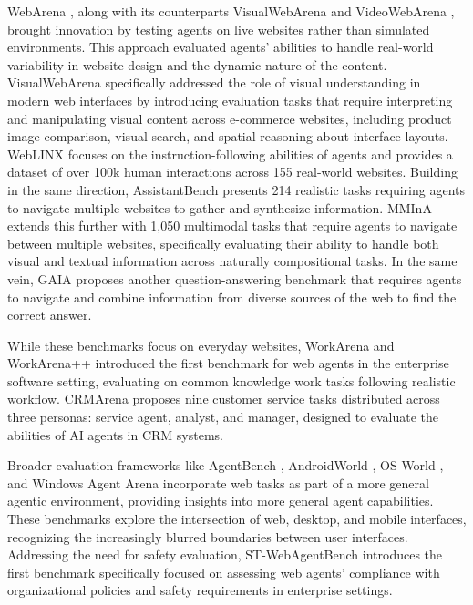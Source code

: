 \documentclass[10pt]{article} %
\begin{document}
WebArena \citep{webarena}, along with its counterparts VisualWebArena \citep{visual-webarena} and VideoWebArena \citep{jang2024videowebarenaevaluatinglongcontext}, brought innovation by testing agents on live websites rather than simulated environments. This approach evaluated agents' abilities to handle real-world variability in website design and the dynamic nature of the content. VisualWebArena specifically addressed the role of visual understanding in modern web interfaces by introducing evaluation tasks that require interpreting and manipulating visual content across e-commerce websites, including product image comparison, visual search, and spatial reasoning about interface layouts.
WebLINX \citep{weblinx} focuses on the instruction-following abilities of agents and provides a dataset of over 100k human interactions across 155 real-world websites. Building in the same direction, AssistantBench \citep{assistant-bench} presents 214 realistic tasks requiring agents to navigate multiple websites to gather and synthesize information. MMInA \citep{mmina} extends this further with 1,050 multimodal tasks that require agents to navigate between multiple websites, specifically evaluating their ability to handle both visual and textual information across naturally compositional tasks. In the same vein, GAIA \citep{mialon2023gaiabenchmarkgeneralai} proposes another question-answering benchmark that requires agents to navigate and combine information from diverse sources of the web to find the correct answer. 

While these benchmarks focus on everyday websites, WorkArena and WorkArena++ \citep{workarena,workarena-plus-plus} introduced the first benchmark for web agents in the enterprise software setting, evaluating on common knowledge work tasks following realistic workflow.
CRMArena \citep{huang2024crmarenaunderstandingcapacityllm} proposes nine customer service tasks distributed across three personas: service agent, analyst, and manager, designed to evaluate the abilities of AI agents in CRM systems.

Broader evaluation frameworks like AgentBench \citep{agent-bench}, AndroidWorld \citep{androidworld}, OS World \citep{osworld}, and Windows Agent Arena \citep{windows-agent-arena} incorporate web tasks as part of a more general agentic environment, providing insights into more general agent capabilities. These benchmarks explore the intersection of web, desktop, and mobile interfaces, recognizing the increasingly blurred boundaries between user interfaces. Addressing the need for safety evaluation, ST-WebAgentBench \citep{st-webagentbench} introduces the first benchmark specifically focused on assessing web agents' compliance with organizational policies and safety requirements in enterprise settings.
\end{document}
